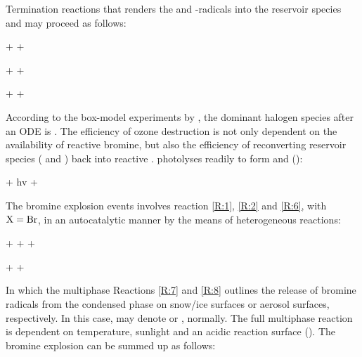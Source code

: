 \medskip

Termination reactions that renders the  and -radicals into the reservoir species  and  may proceed as follows: 


\begin{reaction}
     +  \rightarrow {} + 
    \label{R:6} 
\end{reaction}

\begin{reaction}
     +  \rightarrow {} + 
    \label{R:17}
\end{reaction}


\begin{reaction}
     +  \rightarrow {} + 
    \label{R:16}
\end{reaction}



According to the box-model experiments by \cite{CAO}, the dominant halogen species after an ODE is . The efficiency of ozone destruction is not only dependent on the availability of reactive bromine, but also the efficiency of reconverting reservoir species ( and ) back into reactive .  photolyses readily to form  and  (\cite{Hausmann1994}):

\begin{reaction}
     + hv \rightarrow {} + 
    \label{R:18}
\end{reaction}


The bromine explosion events involves reaction \ref{R:1}, \ref{R:2} and \ref{R:6}, with $\mathrm{X} = \mathrm{Br}$, in an autocatalytic manner by the means of heterogeneous reactions: 

\begin{reaction}
     +  +    +  \label{R:7} 
\end{reaction}
\begin{reaction}
     +    +  \label{R:8}
\end{reaction}



In which the multiphase Reactions \ref{R:7} and \ref{R:8} outlines the release of bromine radicals from the condensed phase on snow/ice surfaces or aerosol surfaces, respectively. In this case,  may denote  or , normally. The full multiphase reaction is dependent on temperature, sunlight and an acidic reaction surface (\cite{Toyota}). The bromine explosion can be summed up as follows: 


